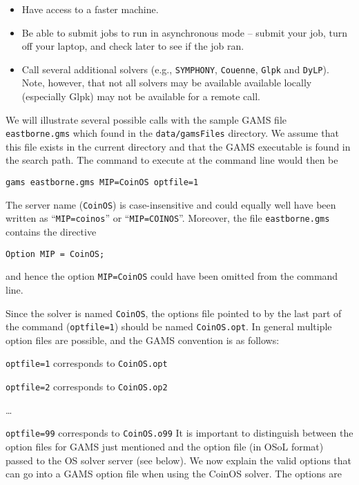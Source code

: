 \begin{itemize}
\item Have access to a faster machine.

\item  Be able to  submit jobs to run in asynchronous mode -- submit your job,  turn off your laptop,  
and check later to see if the job ran.

\item Call several additional solvers (e.g., {\tt SYMPHONY}, {\tt Couenne}, {\tt Glpk} and {\tt DyLP}).
Note, however, that not all solvers may be available available locally (especially Glpk) may not be available for a remote call.

\end{itemize}

We will illustrate several possible calls with the sample GAMS file {\tt eastborne.gms} which found in the
{\tt  data/gamsFiles} directory. We assume that this file exists in the current directory and that the GAMS executable is found in the search path. The command to execute at the command line would then be

\begin{verbatim} 
gams eastborne.gms MIP=CoinOS optfile=1
\end{verbatim}

The server name ({\tt CoinOS}) is case-insensitive and could equally well have been written as 
``{\tt MIP=coinos}'' or ``{\tt MIP=COINOS}''. Moreover, the file {\tt eastborne.gms} contains the directive

\begin{verbatim}
Option MIP = CoinOS;
\end{verbatim}

\noindent and hence the option {\tt MIP=CoinOS} could have been omitted from the command line.

Since the solver is named {\tt CoinOS}, the options file pointed to by the last part of the command
({\tt optfile=1}) should be named {\tt CoinOS.opt}. In general multiple option files are possible, and the GAMS convention is as follows:

{\tt optfile=1} corresponds to {\tt CoinOS.opt}

{\tt optfile=2} corresponds to {\tt CoinOS.op2}

{\ldots}

{\tt optfile=99} corresponds to {\tt CoinOS.o99}
\medskip
It is important to distinguish between the option files for GAMS just mentioned and the  option file (in OSoL format) passed to the OS solver server (see below).
We now explain the valid options that can go into a GAMS option file when using the CoinOS solver. 
The options are

